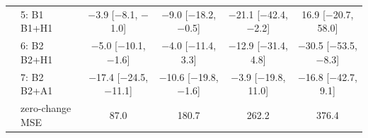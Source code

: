 \begin{table}[h]
{\begin{tabular}{llcccc}
 & 5: B1 \cto{} B1+H1 & $-$3.9 [$-$8.1, $-$1.0] & $-$9.0 [$-$18.2, $-$0.5] & $-$21.1 [$-$42.4, $-$2.2] & 16.9 [$-$20.7, 58.0] \\
 & 6: B2 \cto{} B2+H1 & $-$5.0 [$-$10.1, $-$1.6] & $-$4.0 [$-$11.4, 3.3] & $-$12.9 [$-$31.4, 4.8] & $-$30.5 [$-$53.5, $-$8.3] \\
 & 7: B2 \cto{} B2+A1 & $-$17.4 [$-$24.5, $-$11.1] & $-$10.6 [$-$19.8, $-$1.6] & $-$3.9 [$-$19.8, 11.0] & $-$16.8 [$-$42.7, 9.1] \\
 & zero-change MSE & 87.0 & 180.7 & 262.2 & 376.4 \\
\bottomrule
\end{tabular}
}
\end{table}

